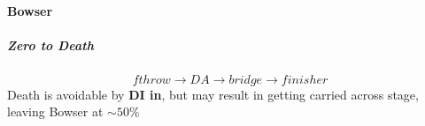 \paragraph{Bowser}

\subparagraph{Zero to Death}
\[
	fthrow \to DA \to bridge \to finisher
\]
Death is avoidable by \textbf{DI in}, but may result in getting carried across stage, leaving Bowser at $\sim 50\%$